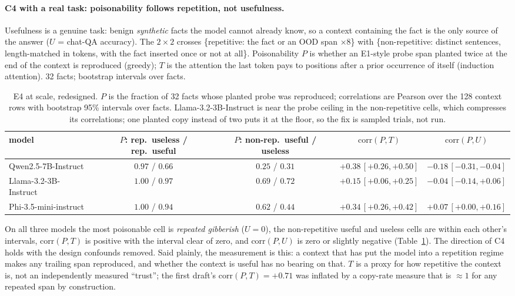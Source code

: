 \documentclass[11pt]{article}
\theoremstyle{plain}
\theoremstyle{definition}
\theoremstyle{remark}
\begin{document}
\paragraph{C4 with a real task: poisonability follows repetition, not usefulness.}\label{sec:e4scale}
Usefulness is a genuine task: benign \emph{synthetic} facts the model cannot already know, so a
context containing the fact is the only source of the answer ($U$ = chat-QA accuracy). The
$2{\times}2$ crosses \{repetitive: the fact or an OOD span $\times 8$\} with \{non-repetitive:
distinct sentences, length-matched in tokens, with the fact inserted once or not at all\}.
Poisonability $P$ is whether an E1-style probe span planted twice at the end of the context is
reproduced (greedy); $T$ is the attention the last token pays to positions after a prior
occurrence of itself (induction attention). 32 facts; bootstrap intervals over facts.

\begin{table}[h]
\centering\small
\begin{tabular}{lcccc}
\toprule
model & $P$: rep.\ useless / rep.\ useful & $P$: non-rep.\ useful / useless & $\mathrm{corr}(P,T)$ & $\mathrm{corr}(P,U)$ \\
\midrule
Qwen2.5-7B-Instruct   & $0.97$ / $0.66$ & $0.25$ / $0.31$ & $+0.38\,[+0.26,+0.50]$ & $-0.18\,[-0.31,-0.04]$ \\
Llama-3.2-3B-Instruct & $1.00$ / $0.97$ & $0.69$ / $0.72$ & $+0.15\,[+0.06,+0.25]$ & $-0.04\,[-0.14,+0.06]$ \\
Phi-3.5-mini-instruct & $1.00$ / $0.94$ & $0.62$ / $0.44$ & $+0.34\,[+0.26,+0.42]$ & $+0.07\,[+0.00,+0.16]$ \\
\bottomrule
\end{tabular}
\caption{E4 at scale, redesigned. $P$ is the fraction of 32 facts whose planted probe was
reproduced; correlations are Pearson over the 128 context rows with bootstrap 95\% intervals
over facts. Llama-3.2-3B-Instruct is near the probe ceiling in the non-repetitive cells, which
compresses its correlations; one planted copy instead of two puts it at the floor, so the fix
is sampled trials, not run.}
\label{tab:e4scale}
\end{table}

On all three models the most poisonable cell is \emph{repeated gibberish} ($U{=}0$), the
non-repetitive useful and useless cells are within each other's intervals, $\mathrm{corr}(P,T)$
is positive with the interval clear of zero, and $\mathrm{corr}(P,U)$ is zero or slightly
negative (Table~\ref{tab:e4scale}). The direction of C4 holds with the design confounds removed.
Said plainly, the measurement is this: a context that has put the model into a repetition
regime makes any trailing span reproduced, and whether the context is useful has no bearing on
that. $T$ is a proxy for how repetitive the context is, not an independently measured ``trust'';
the first draft's $\mathrm{corr}(P,T){=}{+}0.71$ was inflated by a copy-rate measure that is
$\approx1$ for any repeated span by construction.
\end{document}
